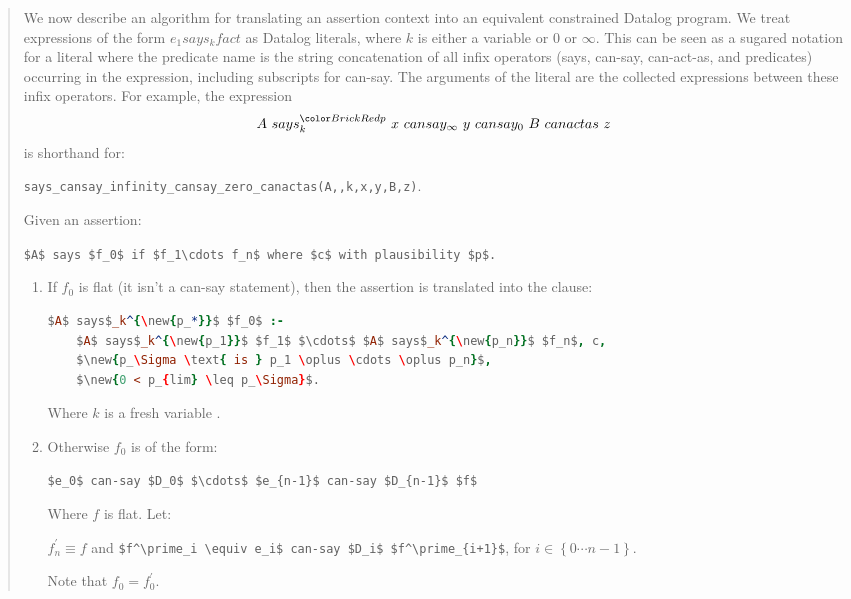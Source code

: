 \begin{quotation}
  \sffamily
  
We now describe an algorithm for translating an assertion context into
an equivalent constrained Datalog program. We treat expressions of the
form $e_1 says_k fact$ as Datalog literals, where $k$ is either a
variable or 0 or $\infty$. This can be seen as a sugared notation for
a literal where the predicate name is the string concatenation of all
infix operators (\textsf{says}, \textsf{can-say}, \textsf{can-act-as},
and predicates) occurring in the expression, including subscripts for
\textsf{can-say}. The arguments of the literal are the collected
expressions between these infix operators. For example, the expression
$$A~says_k^{\new{p}}~x~can say_\infty~y~can say_0~B~can act as~z$$
is shorthand for:
\begin{center}
\texttt{says\_cansay\_infinity\_cansay\_zero\_canactas(A,,k,x,y,B,z)}.
\end{center}

Given an assertion: 

\begin{center} \lstinline!$A$ says $f_0$ if $f_1\cdots f_n$ where $c$ with plausibility $p$.! \end{center}

\begin{enumerate}
\item 
  If $f_0$ is flat (it isn't a can-say statement), then the assertion is translated into the clause:
  \begin{lstlisting}[language=Prolog]
$A$ says$_k^{\new{p_*}}$ $f_0$ :- 
    $A$ says$_k^{\new{p_1}}$ $f_1$ $\cdots$ $A$ says$_k^{\new{p_n}}$ $f_n$, c, 
    $\new{p_\Sigma \text{ is } p_1 \oplus \cdots \oplus p_n}$, 
    $\new{0 < p_{lim} \leq p_\Sigma}$.
  \end{lstlisting}
  Where $k$ is a fresh variable .
  
\item 
  Otherwise $f_0$ is of the form:

  \lstinline!$e_0$ can-say $D_0$ $\cdots$ $e_{n-1}$ can-say $D_{n-1}$ $f$!

  Where $f$ is flat. Let:

  $f^\prime_n \equiv f$ and \lstinline!$f^\prime_i \equiv e_i$ can-say $D_i$ $f^\prime_{i+1}$!, for $i\in\left\{0\cdots n-1\right\}$.

  Note that $f_0 = f^\prime_0$.  


\end{enumerate}
\end{quotation}
